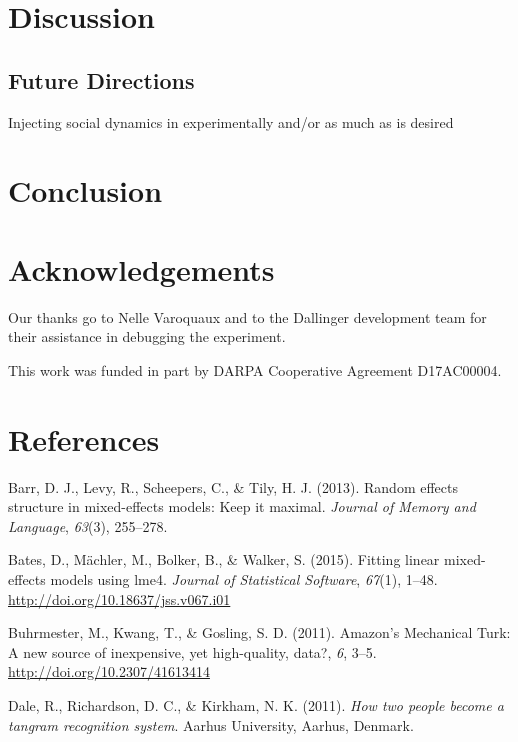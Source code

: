 \documentclass[10pt, letterpaper]{article}
\begin{document}
\section{Discussion}\label{discussion}

\subsection{Future Directions}\label{future-directions}

Injecting social dynamics in experimentally and/or as much as is desired

\section{Conclusion}\label{conclusion}

\section{Acknowledgements}\label{acknowledgements}

Our thanks go to Nelle Varoquaux and to the Dallinger development team
for their assistance in debugging the experiment.

This work was funded in part by DARPA Cooperative Agreement D17AC00004.

\section{References}\label{references}

\setlength{\parindent}{-0.1in} \setlength{\leftskip}{0.125in} \noindent

\hypertarget{refs}{}
\hypertarget{ref-barr2013random}{}
Barr, D. J., Levy, R., Scheepers, C., \& Tily, H. J. (2013). Random
effects structure in mixed-effects models: Keep it maximal.
\emph{Journal of Memory and Language}, \emph{63}(3), 255--278.

\hypertarget{ref-bates2015fitting}{}
Bates, D., Mächler, M., Bolker, B., \& Walker, S. (2015). Fitting linear
mixed-effects models using lme4. \emph{Journal of Statistical Software},
\emph{67}(1), 1--48. \url{http://doi.org/10.18637/jss.v067.i01}

\hypertarget{ref-buhrmester2011amazon}{}
Buhrmester, M., Kwang, T., \& Gosling, S. D. (2011). Amazon's Mechanical
Turk: A new source of inexpensive, yet high-quality, data?, \emph{6},
3--5. \url{http://doi.org/10.2307/41613414}

\hypertarget{ref-dale2011how}{}
Dale, R., Richardson, D. C., \& Kirkham, N. K. (2011). \emph{How two
people become a tangram recognition system}. Aarhus University, Aarhus,
Denmark.
\end{document}

